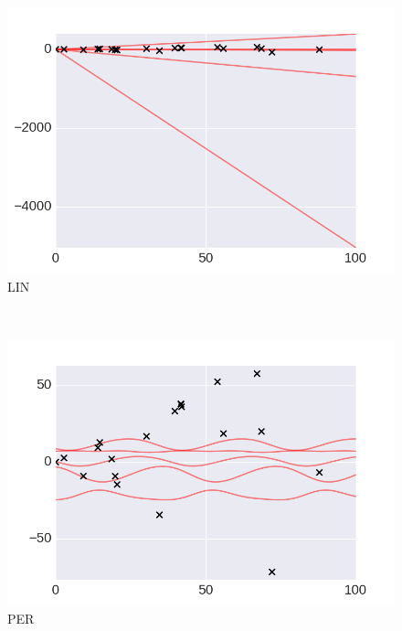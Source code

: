      \begin{subfigure}[b]{0.3\textwidth}
        \includegraphics[width=\textwidth]{figs/composition/composition_demo_LIN_prior.png}
        \caption{LIN}
    \end{subfigure}
    ~ %
    \begin{subfigure}[b]{0.3\textwidth}
        \includegraphics[width=\textwidth]{figs/composition/composition_demo_PER_prior.png}
        \caption{PER}
    \end{subfigure}
    ~ %
